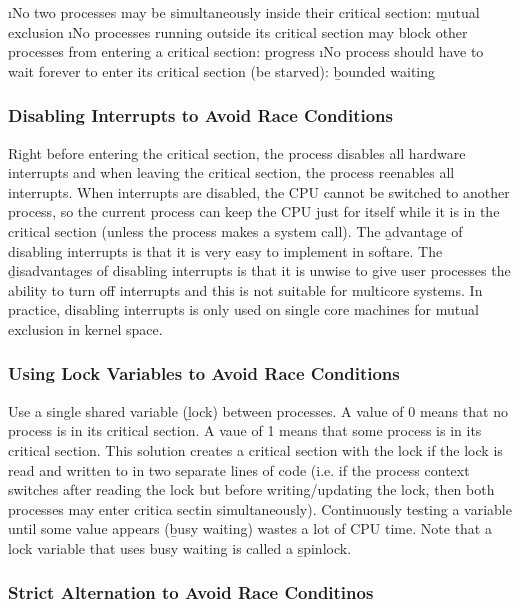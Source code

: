 \documentclass{article}
\begin{document}
    \begin{enumerate}
    \i No two processes may be simultaneously inside their critical section: \b{mutual exclusion}
    \i No processes running outside its critical section may block other processes from entering a critical section: \b{progress}
    \i No process should have to wait forever to enter its critical section (be starved): \b{bounded waiting}
    \end{enumerate}

    \subsubsection{Disabling Interrupts to Avoid Race Conditions}
    
    Right before entering the critical section, the process disables all hardware interrupts and when leaving the critical section, the process reenables all interrupts. When interrupts are disabled, the CPU cannot be switched to another process, so the current process can keep the CPU just for itself while it is in the critical section (unless the process makes a system call). The \b{advantage} of disabling interrupts is that it is very easy to implement in softare. The \b{disadvantages} of disabling interrupts is that it is unwise to give user processes the ability to turn off interrupts and this is not suitable for multicore systems. In practice, disabling interrupts is only used on single core machines for mutual exclusion in kernel space. 
    
    \subsubsection{Using Lock Variables to Avoid Race Conditions}

    Use a single shared variable (\b{lock}) between processes. A value of 0 means that no process is in its critical section. A vaue of 1 means that some process is in its critical section. This solution creates a critical section with the lock if the lock is read and written to in two separate lines of code (i.e. if the process context switches after reading the lock but before writing/updating the lock, then both processes may enter critica sectin simultaneously). Continuously testing a variable until some value appears (\b{busy waiting}) wastes a lot of CPU time. Note that a lock variable that uses busy waiting is called a \b{spinlock}. 

    \subsubsection{Strict Alternation to Avoid Race Conditinos}
\end{document}
